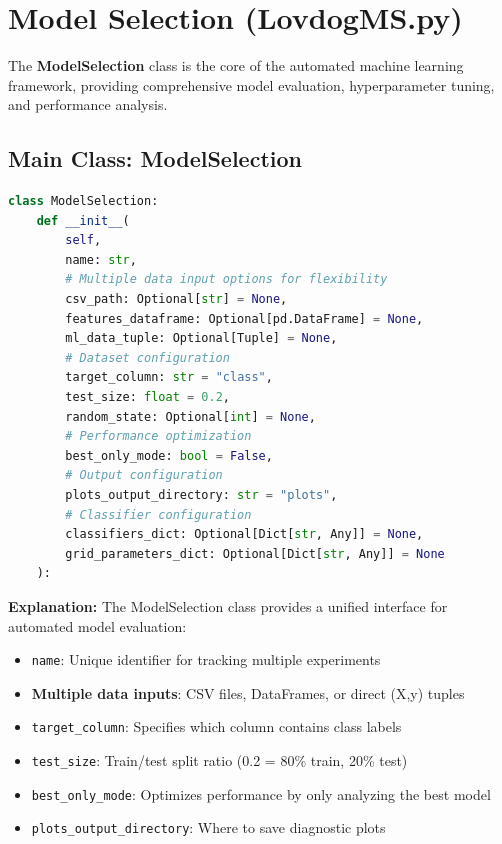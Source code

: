 \documentclass[10pt]{book}
\begin{document}
\chapter{Model Selection (LovdogMS.py)}

The \textbf{ModelSelection} class is the core of the automated machine learning framework, providing comprehensive model evaluation, hyperparameter tuning, and performance analysis.

\section{Main Class: ModelSelection}

\begin{lstlisting}[language=Python]
class ModelSelection:
    def __init__(
        self, 
        name: str, 
        # Multiple data input options for flexibility
        csv_path: Optional[str] = None,
        features_dataframe: Optional[pd.DataFrame] = None,
        ml_data_tuple: Optional[Tuple] = None,
        # Dataset configuration
        target_column: str = "class",
        test_size: float = 0.2,
        random_state: Optional[int] = None,
        # Performance optimization
        best_only_mode: bool = False,
        # Output configuration
        plots_output_directory: str = "plots",
        # Classifier configuration
        classifiers_dict: Optional[Dict[str, Any]] = None,
        grid_parameters_dict: Optional[Dict[str, Any]] = None
    ):
\end{lstlisting}

\textbf{Explanation:}
The ModelSelection class provides a unified interface for automated model evaluation:

\begin{itemize}
\item \texttt{name}: Unique identifier for tracking multiple experiments
\item \textbf{Multiple data inputs}: CSV files, DataFrames, or direct (X,y) tuples
\item \texttt{target\_column}: Specifies which column contains class labels
\item \texttt{test\_size}: Train/test split ratio (0.2 = 80\% train, 20\% test)
\item \texttt{best\_only\_mode}: Optimizes performance by only analyzing the best model
\item \texttt{plots\_output\_directory}: Where to save diagnostic plots
\end{itemize}
\end{document}
